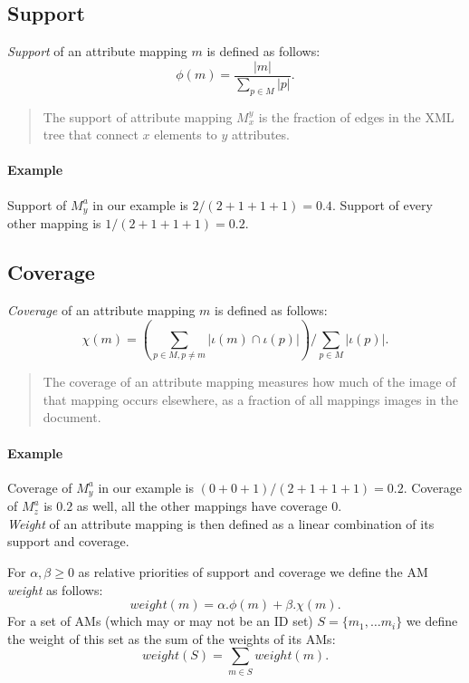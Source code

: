 \subsection{Support}

\begin{define}[Support]
\textit{Support} of an attribute mapping $m$ is defined as follows:
\[\phi(m) = \frac{|m|}{\sum_{p \in M}|p|}.\]
\end{define}

\begin{quote}
The support of attribute mapping $M_x^y$ is the fraction of edges in the XML tree that connect $x$ elements to $y$ attributes.
\end{quote}

\paragraph{Example}
Support of $M_{y}^{a}$ in our example is $2 / (2+1+1+1) = 0.4$. Support of every other mapping is $1 / (2+1+1+1) = 0.2$.\\

\subsection{Coverage}

\begin{define}[Coverage]
\textit{Coverage} of an attribute mapping $m$ is defined as follows:
\[\chi(m) = \left( \sum_{p \in M, p \neq m} |\iota(m) \cap \iota(p)| \right) / \sum_{p \in M} |\iota(p)|.\]
\end{define}

\begin{quote}
The coverage of an attribute mapping measures how much of the image of that mapping occurs elsewhere, as a fraction of all mappings images in the document.
\end{quote}

\paragraph{Example}
Coverage of $M_{y}^{a}$ in our example is $(0+0+1) / (2+1+1+1) = 0.2$. Coverage of $M_{z}^{a}$ is $0.2$ as well, all the other mappings have coverage $0$.
\\

\textit{Weight} of an attribute mapping is then defined as a linear combination of its support and coverage.

\begin{define}[Weight]
For $\alpha, \beta \geq 0$ as relative priorities of support and coverage we define the AM \textit{weight} as follows:
\[weight(m) = \alpha . \phi(m) + \beta . \chi(m).\]
For a set of AMs (which may or may not be an ID set) $S = \{m_1, \ldots m_i\}$ we define the weight of this set as the sum of the weights of its AMs:
\[weight(S) = \sum_{m \in S} weight(m).\]
\end{define}

